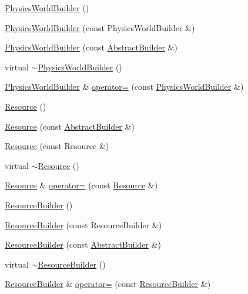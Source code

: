 \begin{DoxyCompactItemize}
\item 
\hyperlink{namespacejli_aa97fa0da471fb9eb0a9d7db6acd73389}{Physics\+World\+Builder} ()
\item 
\hyperlink{namespacejli_a48223b78110a9d35f603997bd29107cf}{Physics\+World\+Builder} (const Physics\+World\+Builder \&)
\item 
\hyperlink{namespacejli_a6ccccef1adeea86e63074e58e0c2f6cc}{Physics\+World\+Builder} (const \hyperlink{classjli_1_1_abstract_builder}{Abstract\+Builder} \&)
\item 
virtual \hyperlink{namespacejli_aee777c7761e80a169373be5f6d1f2c58}{$\sim$\+Physics\+World\+Builder} ()
\item 
\hyperlink{namespacejli_aa97fa0da471fb9eb0a9d7db6acd73389}{Physics\+World\+Builder} \& \hyperlink{namespacejli_a4f5fac6387bb41472fedc1ff5cf86955}{operator=} (const \hyperlink{namespacejli_aa97fa0da471fb9eb0a9d7db6acd73389}{Physics\+World\+Builder} \&)
\item 
\hyperlink{namespacejli_a4726f256ac2f44778dafed297f23afd8}{Resource} ()
\item 
\hyperlink{namespacejli_a9ad3207aaa7ced8efc757bbb0464a0d7}{Resource} (const \hyperlink{classjli_1_1_abstract_builder}{Abstract\+Builder} \&)
\item 
\hyperlink{namespacejli_a81283b9d009d7035c20bcc160a4093ce}{Resource} (const Resource \&)
\item 
virtual \hyperlink{namespacejli_aea5d50a87798b1ed6aa82171cb6f666d}{$\sim$\+Resource} ()
\item 
\hyperlink{namespacejli_a4726f256ac2f44778dafed297f23afd8}{Resource} \& \hyperlink{namespacejli_aa42f10f677bd4750e4a4e5ece8523ab0}{operator=} (const \hyperlink{namespacejli_a4726f256ac2f44778dafed297f23afd8}{Resource} \&)
\item 
\hyperlink{namespacejli_ae9f9f7477ddfe0b9d4ac195927e749b4}{Resource\+Builder} ()
\item 
\hyperlink{namespacejli_ac25c61dfb7fd3cd0172ccf6a5d6d9598}{Resource\+Builder} (const Resource\+Builder \&)
\item 
\hyperlink{namespacejli_a2f0f2d3abddab36a2e632d5fe25bdea7}{Resource\+Builder} (const \hyperlink{classjli_1_1_abstract_builder}{Abstract\+Builder} \&)
\item 
virtual \hyperlink{namespacejli_a7e46cbc7bc71f3c538261e41816e87b0}{$\sim$\+Resource\+Builder} ()
\item 
\hyperlink{namespacejli_ae9f9f7477ddfe0b9d4ac195927e749b4}{Resource\+Builder} \& \hyperlink{namespacejli_a544c167a86203fa931b358dc2e77df53}{operator=} (const \hyperlink{namespacejli_ae9f9f7477ddfe0b9d4ac195927e749b4}{Resource\+Builder} \&)

\end{DoxyCompactItemize}
